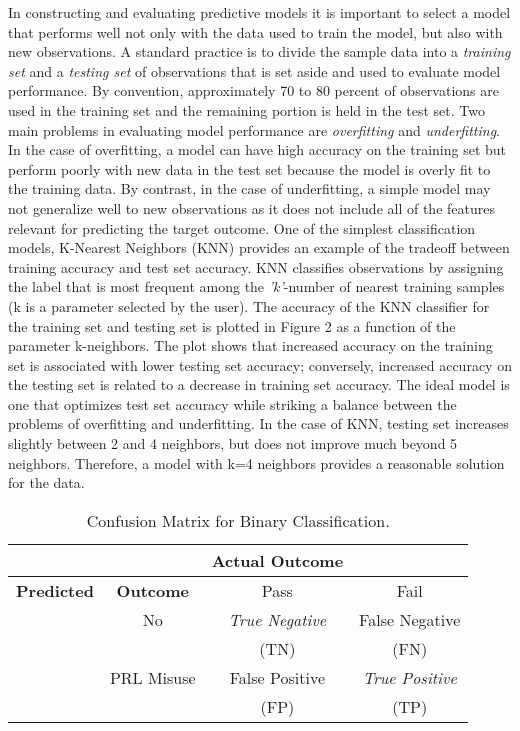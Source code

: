 \documentclass[sigconf]{acmart}
\begin{document}
In constructing and evaluating predictive models it is important to select 
a model that performs well not only with the data used to train the model, 
but also with new observations. A standard practice is to divide the sample 
data into a \emph{training set} and a \emph{testing set} of observations 
that is set aside and used to evaluate model performance. By convention, 
approximately 70 to 80 percent of observations are used in the training set 
and the remaining portion is held in the test set. Two main problems in 
evaluating model performance are \emph{overfitting} and \emph{underfitting}. 
In the case of overfitting, a model can have high accuracy on the training 
set but perform poorly with new data in the test set because the model is 
overly fit to the training data. By contrast, in the case of underfitting, 
a simple model may not generalize well to new observations as it does not 
include all of the features relevant for predicting the target outcome. 
One of the simplest classification models, K-Nearest Neighbors (KNN) 
provides an example of the tradeoff between training accuracy and test 
set accuracy. KNN classifies observations by assigning the label that 
is most frequent among the \textit{'k'}-number of nearest training samples 
(k is a parameter selected by the user). The accuracy of the KNN classifier 
for the training set and testing set is plotted in Figure 2 as a function
of the parameter k-neighbors. The plot shows that increased accuracy on 
the training set is associated with lower testing set accuracy; conversely, 
increased accuracy on the testing set is related to a decrease in training 
set accuracy. The ideal model is one that optimizes test set accuracy while 
striking a balance between the problems of overfitting and underfitting. 
In the case of KNN, testing set increases slightly between 2 and 4 neighbors, 
but does not improve much beyond 5 neighbors. Therefore, a model with k=4 
neighbors provides a reasonable solution for the data. 


\begin{table}
  \caption{Confusion Matrix for Binary Classification.}
  \label{tab:freq}
  \begin{tabular}{cccc}
    \toprule
     & &  \textbf{Actual Outcome} & \\
    \midrule
    \textbf{Predicted} & \textbf{Outcome} & Pass & Fail \\
    \midrule
    & No & \textit{True Negative} & False Negative \\
    & & (TN) & (FN) \\
    \midrule
    & PRL Misuse & False Positive & \textit{True Positive} \\
    & & (FP) & (TP)  \\
    \bottomrule
  \end{tabular}
\end{table}
\end{document}
